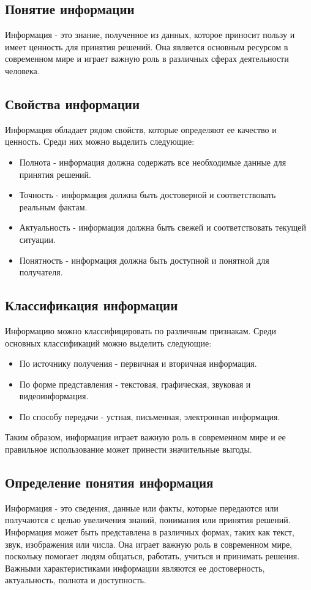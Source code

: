 \documentclass{article}
\begin{document}
\subsection{Понятие информации}
Информация - это знание, полученное из данных, которое приносит пользу и имеет ценность для принятия решений. Она является основным ресурсом в современном мире и играет важную роль в различных сферах деятельности человека.
\subsection{Свойства информации}
Информация обладает рядом свойств, которые определяют ее качество и ценность. Среди них можно выделить следующие:
\begin{itemize}
\item Полнота - информация должна содержать все необходимые данные для принятия решений.
\item Точность - информация должна быть достоверной и соответствовать реальным фактам.
\item Актуальность - информация должна быть свежей и соответствовать текущей ситуации.
\item Понятность - информация должна быть доступной и понятной для получателя.
\end{itemize}
\subsection{Классификация информации}
Информацию можно классифицировать по различным признакам. Среди основных классификаций можно выделить следующие:
\begin{itemize}
\item По источнику получения - первичная и вторичная информация.
\item По форме представления - текстовая, графическая, звуковая и видеоинформация.
\item По способу передачи - устная, письменная, электронная информация.
\end{itemize}
Таким образом, информация играет важную роль в современном мире и ее правильное использование может принести значительные выгоды.
\subsection{Определение понятия информация}
Информация - это сведения, данные или факты, которые передаются или получаются с целью увеличения знаний, понимания или принятия решений. Информация может быть представлена в различных формах, таких как текст, звук, изображения или числа. Она играет важную роль в современном мире, поскольку помогает людям общаться, работать, учиться и принимать решения. Важными характеристиками информации являются ее достоверность, актуальность, полнота и доступность.
\end{document}
